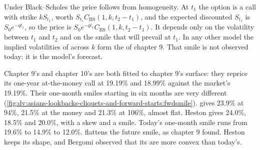Under Black--Scholes the price follows from homogeneity. At $t_1$ the option is a call with strike $kS_{t_1}$, worth
$S_{t_1}C_{\mathrm{BS}}(1,k,t_2-t_1)$, and the expected discounted $S_{t_1}$ is $S_0e^{-qt_1}$, so the price is
$S_0e^{-qt_1}C_{\mathrm{BS}}(1,k,t_2-t_1)$. It depends only on the volatility between $t_1$ and $t_2$ and on the
smile that will prevail at $t_1$. In any other model the implied volatilities of  across $k$ form
the  of chapter 9. That smile is not observed today: it is the model's forecast.

\begin{example}\label{ex:dv:asians-lookbacks-cliquets-and-forward-starts:fwdsmile}
Chapter 9's  and chapter 10's  are both fitted to chapter 9's surface: they reprice its
one-year at-the-money call at 19.19\% and 18.99\% against the market's 19.19\%. Their one-month smiles starting in six
months are very different (\cref{fig:dv:asians-lookbacks-cliquets-and-forward-starts:fwdsmile}).  gives
23.9\% at 94\%, 21.5\% at the money and 21.3\% at 106\%, almost flat. Heston gives 24.0\%, 18.5\% and 20.0\%, with a skew
and a smile. Today's one-month smile runs from 19.6\% to 14.9\% to 12.0\%.  flattens the future smile, as
chapter 9 found. Heston keeps its shape, and Bergomi observed that its  are more convex than today's.
\end{example}

